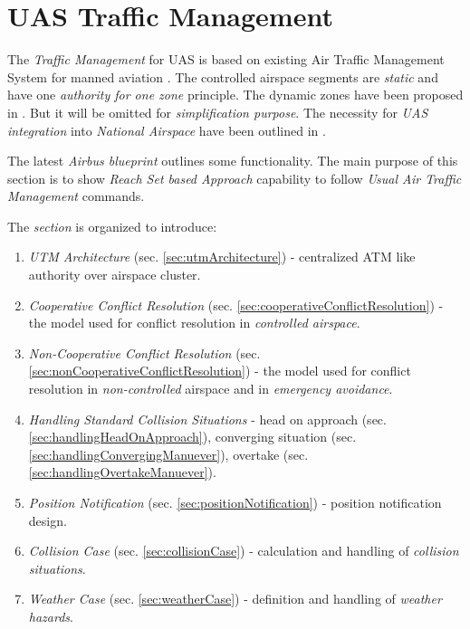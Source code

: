 \section{UAS Traffic Management}\label{sec:UASTrafficManagement}

The \emph{Traffic Management} for UAS is based on existing Air Traffic Management System for manned aviation \cite{icao4444}. The controlled airspace segments are \emph{static} and have one \emph{authority for one zone} principle. The dynamic zones have been proposed in \cite{gerdes2016dynamic}. But it will be omitted for \emph{simplification purpose}. The necessity for \emph{UAS integration} into \emph{National Airspace} have been outlined in \cite{spriesterbach2013unmanned}.

The latest \emph{Airbus blueprint} \cite{airbusUTM2018blueprint} outlines some functionality. The main purpose of this section is to show \emph{Reach Set based Approach} capability to follow \emph{Usual Air Traffic Management} commands.

The \emph{section} is organized to introduce:
\begin{enumerate}
    \item \emph{UTM Architecture} (sec. \ref{sec:utmArchitecture}) - centralized ATM like authority over airspace cluster.
    
    \item \emph{Cooperative Conflict Resolution} (sec. \ref{sec:cooperativeConflictResolution}) - the model used for conflict resolution in \emph{controlled airspace}.
    
    \item \emph{Non-Cooperative Conflict Resolution} (sec. \ref{sec:nonCooperativeConflictResolution})  - the model used for conflict resolution in \emph{non-controlled} airspace and in \emph{emergency avoidance}.
    
    \item \emph{Handling Standard Collision Situations} - head on approach (sec. \ref{sec:handlingHeadOnApproach}), converging situation (sec. \ref{sec:handlingConvergingManuever}), overtake (sec. \ref{sec:handlingOvertakeManuever}).
    
    \item \emph{Position Notification} (sec. \ref{sec:positionNotification}) - position notification design.
    
    \item \emph{Collision Case} (sec. \ref{sec:collisionCase}) - calculation and handling of \emph{collision situations}.
    
    \item \emph{Weather Case} (sec. \ref{sec:weatherCase}) - definition and handling of \emph{weather hazards}.
\end{enumerate}